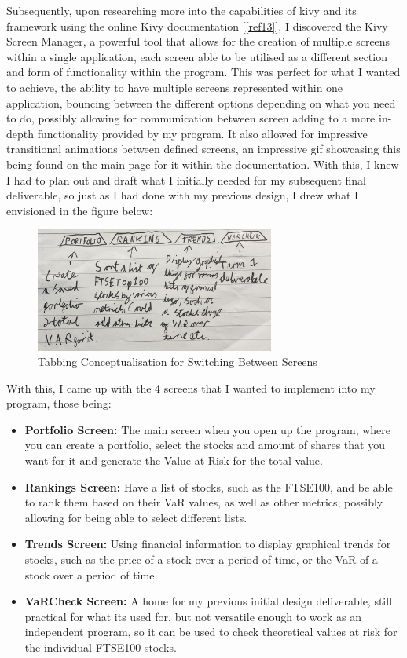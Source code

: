\documentclass{article}
\begin{document}
Subsequently, upon researching more into the capabilities of kivy and its framework using the online Kivy documentation [\ref{ref13}], I discovered the Kivy Screen Manager, a powerful tool that allows for the creation of multiple screens within a single application, each screen able to be utilised as a different section and form of functionality within the program. This was perfect for what I wanted to achieve, the ability to have multiple screens represented within one application, bouncing between the different options depending on what you need to do, possibly allowing for communication between screen adding to a more in-depth functionality provided by my program. It also allowed for impressive transitional animations between defined screens, an impressive gif showcasing this being found on the main page for it within the documentation. With this, I knew I had to plan out and draft what I initially needed for my subsequent final deliverable, so just as I had done with my previous design, I drew what I envisioned in the figure below:\\\vspace{0.3cm}

\begin{figure}[h]
  \centering
  \includegraphics[width=0.7\textwidth]{Images/Term 2 Images/IMG_1346.jpg}
  \caption{Tabbing Conceptualisation for Switching Between Screens}
  \label{fig:Tabbing Concept}
\end{figure}

With this, I came up with the 4 screens that I wanted to implement into my program, those being:
\begin{itemize}
  \item \textbf{Portfolio Screen:} The main screen when you open up the program, where you can create a portfolio, select the stocks and amount of shares that you want for it and generate the Value at Risk for the total value.
  \item \textbf{Rankings Screen:} Have a list of stocks, such as the FTSE100, and be able to rank them based on their VaR values, as well as other metrics, possibly allowing for being able to select different lists.
  \item \textbf{Trends Screen:} Using financial information to display graphical trends for stocks, such as the price of a stock over a period of time, or the VaR of a stock over a period of time.
  \item \textbf{VaRCheck Screen:} A home for my previous initial design deliverable, still practical for what its used for, but not versatile enough to work as an independent program, so it can be used to check theoretical values at risk for the individual FTSE100 stocks.
\end{itemize}
\end{document}

